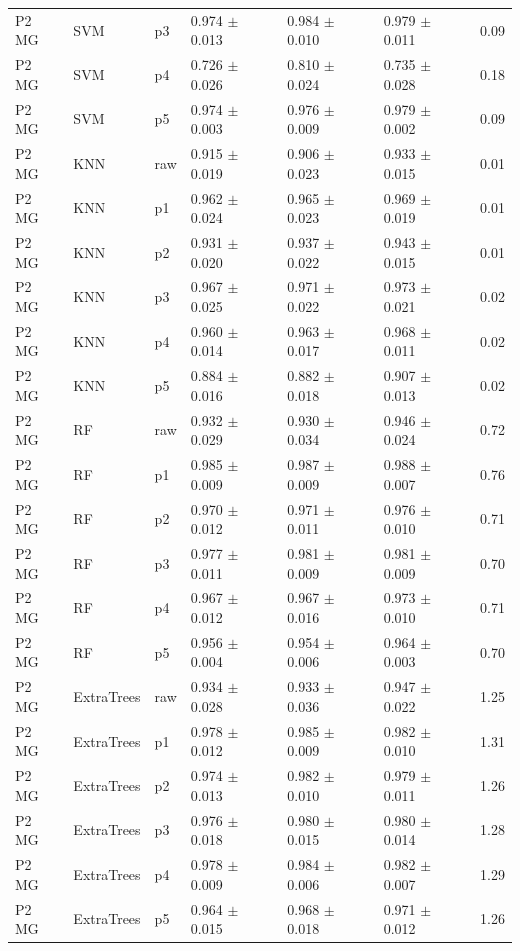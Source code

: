 {\begin{longtable}{L{2.35cm}L{2.4cm}L{1.0cm}L{2.35cm}L{2.25cm}L{2.25cm}L{1.45cm}}
P2 MG & SVM & p3 & 0.974 $\pm$ 0.013 & 0.984 $\pm$ 0.010 & 0.979 $\pm$ 0.011 & 0.09 \\
P2 MG & SVM & p4 & 0.726 $\pm$ 0.026 & 0.810 $\pm$ 0.024 & 0.735 $\pm$ 0.028 & 0.18 \\
P2 MG & SVM & p5 & 0.974 $\pm$ 0.003 & 0.976 $\pm$ 0.009 & 0.979 $\pm$ 0.002 & 0.09 \\
P2 MG & KNN & raw & 0.915 $\pm$ 0.019 & 0.906 $\pm$ 0.023 & 0.933 $\pm$ 0.015 & 0.01 \\
P2 MG & KNN & p1 & 0.962 $\pm$ 0.024 & 0.965 $\pm$ 0.023 & 0.969 $\pm$ 0.019 & 0.01 \\
P2 MG & KNN & p2 & 0.931 $\pm$ 0.020 & 0.937 $\pm$ 0.022 & 0.943 $\pm$ 0.015 & 0.01 \\
P2 MG & KNN & p3 & 0.967 $\pm$ 0.025 & 0.971 $\pm$ 0.022 & 0.973 $\pm$ 0.021 & 0.02 \\
P2 MG & KNN & p4 & 0.960 $\pm$ 0.014 & 0.963 $\pm$ 0.017 & 0.968 $\pm$ 0.011 & 0.02 \\
P2 MG & KNN & p5 & 0.884 $\pm$ 0.016 & 0.882 $\pm$ 0.018 & 0.907 $\pm$ 0.013 & 0.02 \\
P2 MG & RF & raw & 0.932 $\pm$ 0.029 & 0.930 $\pm$ 0.034 & 0.946 $\pm$ 0.024 & 0.72 \\
P2 MG & RF & p1 & 0.985 $\pm$ 0.009 & 0.987 $\pm$ 0.009 & 0.988 $\pm$ 0.007 & 0.76 \\
P2 MG & RF & p2 & 0.970 $\pm$ 0.012 & 0.971 $\pm$ 0.011 & 0.976 $\pm$ 0.010 & 0.71 \\
P2 MG & RF & p3 & 0.977 $\pm$ 0.011 & 0.981 $\pm$ 0.009 & 0.981 $\pm$ 0.009 & 0.70 \\
P2 MG & RF & p4 & 0.967 $\pm$ 0.012 & 0.967 $\pm$ 0.016 & 0.973 $\pm$ 0.010 & 0.71 \\
P2 MG & RF & p5 & 0.956 $\pm$ 0.004 & 0.954 $\pm$ 0.006 & 0.964 $\pm$ 0.003 & 0.70 \\
P2 MG & ExtraTrees & raw & 0.934 $\pm$ 0.028 & 0.933 $\pm$ 0.036 & 0.947 $\pm$ 0.022 & 1.25 \\
P2 MG & ExtraTrees & p1 & 0.978 $\pm$ 0.012 & 0.985 $\pm$ 0.009 & 0.982 $\pm$ 0.010 & 1.31 \\
P2 MG & ExtraTrees & p2 & 0.974 $\pm$ 0.013 & 0.982 $\pm$ 0.010 & 0.979 $\pm$ 0.011 & 1.26 \\
P2 MG & ExtraTrees & p3 & 0.976 $\pm$ 0.018 & 0.980 $\pm$ 0.015 & 0.980 $\pm$ 0.014 & 1.28 \\
P2 MG & ExtraTrees & p4 & 0.978 $\pm$ 0.009 & 0.984 $\pm$ 0.006 & 0.982 $\pm$ 0.007 & 1.29 \\
P2 MG & ExtraTrees & p5 & 0.964 $\pm$ 0.015 & 0.968 $\pm$ 0.018 & 0.971 $\pm$ 0.012 & 1.26 \\

\end{longtable}}
